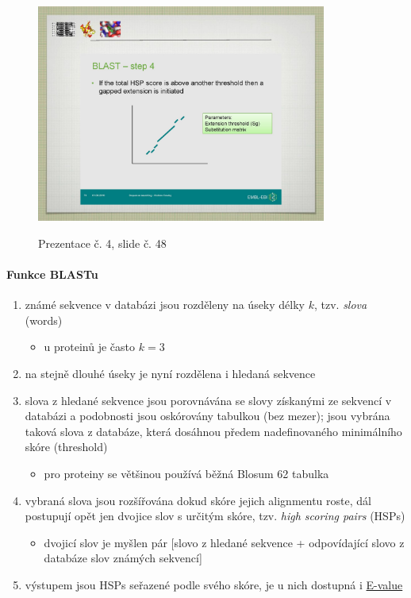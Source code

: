 \documentclass[DIV=8]{scrreprt}
\begin{document}
\begin{figure}
    \caption{Prezentace č. 4, slide č. 48}
    \includegraphics[width=0.85\textwidth]{slides-4/slide-48.jpg}
    \centering
    \label{slides-4-slide-48}
\end{figure}

\paragraph{Funkce BLASTu}
\begin{enumerate}[nosep]
    \item známé sekvence v databázi jsou rozděleny na úseky délky \(k\), tzv. \emph{slova} (words)
\begin{itemize}[nosep]
    \item u proteinů je často \(k = 3\)
\end{itemize}

    \item na stejně dlouhé úseky je nyní rozdělena i hledaná sekvence
    \item slova z hledané sekvence jsou porovnávána se slovy získanými ze sekvencí v databázi a podobnosti jsou oskórovány tabulkou (bez mezer); jsou vybrána taková slova z databáze, která dosáhnou předem nadefinovaného minimálního skóre (threshold)
\begin{itemize}[nosep]
    \item pro proteiny se většinou používá běžná Blosum 62 tabulka
\end{itemize}

    \item vybraná slova jsou rozšířována dokud skóre jejich alignmentu roste, dál postupují opět jen dvojice slov s určitým skóre, tzv. \emph{high scoring pairs} (HSPs)
\begin{itemize}[nosep]
    \item dvojicí slov je myšlen pár [slovo z hledané sekvence + odpovídající slovo z databáze slov známých sekvencí]
\end{itemize}

    \item výstupem jsou HSPs seřazené podle svého skóre, je u nich dostupná i \href{Parametry významnosti alignmentu}{E-value}
\end{enumerate}
\end{document}

